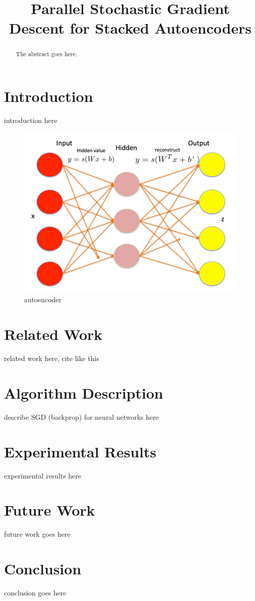 \documentclass[conference]{IEEEtran}
\begin{document}
\title{Parallel Stochastic Gradient Descent for Stacked Autoencoders}

\author{
\and
{}
}

\maketitle

\begin{abstract}
The abstract goes here.
\end{abstract}

\section{Introduction}
introduction here

\begin{figure}[h]
\centering
\includegraphics[width=0.9\linewidth]{autoencoder.png}
\caption{autoencoder}
\end{figure}

\section{Related Work}
related work here, cite like this \cite{vincent2010stacked}

\section{Algorithm Description}
describe SGD (backprop) for neural networks here

\section{Experimental Results}
experimental results here

\section{Future Work}
future work goes here

\section{Conclusion}
conclusion goes here



\end{document}
